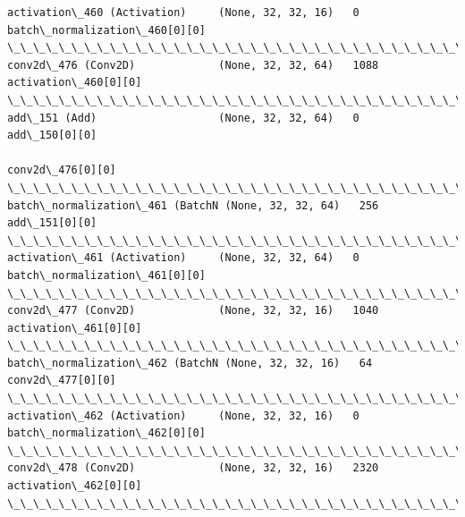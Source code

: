 \documentclass[11pt]{article}
\begin{document}
\begin{Verbatim}[commandchars=\\\{\}]
activation\_460 (Activation)     (None, 32, 32, 16)   0           batch\_normalization\_460[0][0]    
\_\_\_\_\_\_\_\_\_\_\_\_\_\_\_\_\_\_\_\_\_\_\_\_\_\_\_\_\_\_\_\_\_\_\_\_\_\_\_\_\_\_\_\_\_\_\_\_\_\_\_\_\_\_\_\_\_\_\_\_\_\_\_\_\_\_\_\_\_\_\_\_\_\_\_\_\_\_\_\_\_\_\_\_\_\_\_\_\_\_\_\_\_\_\_\_\_\_
conv2d\_476 (Conv2D)             (None, 32, 32, 64)   1088        activation\_460[0][0]             
\_\_\_\_\_\_\_\_\_\_\_\_\_\_\_\_\_\_\_\_\_\_\_\_\_\_\_\_\_\_\_\_\_\_\_\_\_\_\_\_\_\_\_\_\_\_\_\_\_\_\_\_\_\_\_\_\_\_\_\_\_\_\_\_\_\_\_\_\_\_\_\_\_\_\_\_\_\_\_\_\_\_\_\_\_\_\_\_\_\_\_\_\_\_\_\_\_\_
add\_151 (Add)                   (None, 32, 32, 64)   0           add\_150[0][0]                    
                                                                 conv2d\_476[0][0]                 
\_\_\_\_\_\_\_\_\_\_\_\_\_\_\_\_\_\_\_\_\_\_\_\_\_\_\_\_\_\_\_\_\_\_\_\_\_\_\_\_\_\_\_\_\_\_\_\_\_\_\_\_\_\_\_\_\_\_\_\_\_\_\_\_\_\_\_\_\_\_\_\_\_\_\_\_\_\_\_\_\_\_\_\_\_\_\_\_\_\_\_\_\_\_\_\_\_\_
batch\_normalization\_461 (BatchN (None, 32, 32, 64)   256         add\_151[0][0]                    
\_\_\_\_\_\_\_\_\_\_\_\_\_\_\_\_\_\_\_\_\_\_\_\_\_\_\_\_\_\_\_\_\_\_\_\_\_\_\_\_\_\_\_\_\_\_\_\_\_\_\_\_\_\_\_\_\_\_\_\_\_\_\_\_\_\_\_\_\_\_\_\_\_\_\_\_\_\_\_\_\_\_\_\_\_\_\_\_\_\_\_\_\_\_\_\_\_\_
activation\_461 (Activation)     (None, 32, 32, 64)   0           batch\_normalization\_461[0][0]    
\_\_\_\_\_\_\_\_\_\_\_\_\_\_\_\_\_\_\_\_\_\_\_\_\_\_\_\_\_\_\_\_\_\_\_\_\_\_\_\_\_\_\_\_\_\_\_\_\_\_\_\_\_\_\_\_\_\_\_\_\_\_\_\_\_\_\_\_\_\_\_\_\_\_\_\_\_\_\_\_\_\_\_\_\_\_\_\_\_\_\_\_\_\_\_\_\_\_
conv2d\_477 (Conv2D)             (None, 32, 32, 16)   1040        activation\_461[0][0]             
\_\_\_\_\_\_\_\_\_\_\_\_\_\_\_\_\_\_\_\_\_\_\_\_\_\_\_\_\_\_\_\_\_\_\_\_\_\_\_\_\_\_\_\_\_\_\_\_\_\_\_\_\_\_\_\_\_\_\_\_\_\_\_\_\_\_\_\_\_\_\_\_\_\_\_\_\_\_\_\_\_\_\_\_\_\_\_\_\_\_\_\_\_\_\_\_\_\_
batch\_normalization\_462 (BatchN (None, 32, 32, 16)   64          conv2d\_477[0][0]                 
\_\_\_\_\_\_\_\_\_\_\_\_\_\_\_\_\_\_\_\_\_\_\_\_\_\_\_\_\_\_\_\_\_\_\_\_\_\_\_\_\_\_\_\_\_\_\_\_\_\_\_\_\_\_\_\_\_\_\_\_\_\_\_\_\_\_\_\_\_\_\_\_\_\_\_\_\_\_\_\_\_\_\_\_\_\_\_\_\_\_\_\_\_\_\_\_\_\_
activation\_462 (Activation)     (None, 32, 32, 16)   0           batch\_normalization\_462[0][0]    
\_\_\_\_\_\_\_\_\_\_\_\_\_\_\_\_\_\_\_\_\_\_\_\_\_\_\_\_\_\_\_\_\_\_\_\_\_\_\_\_\_\_\_\_\_\_\_\_\_\_\_\_\_\_\_\_\_\_\_\_\_\_\_\_\_\_\_\_\_\_\_\_\_\_\_\_\_\_\_\_\_\_\_\_\_\_\_\_\_\_\_\_\_\_\_\_\_\_
conv2d\_478 (Conv2D)             (None, 32, 32, 16)   2320        activation\_462[0][0]             
\_\_\_\_\_\_\_\_\_\_\_\_\_\_\_\_\_\_\_\_\_\_\_\_\_\_\_\_\_\_\_\_\_\_\_\_\_\_\_\_\_\_\_\_\_\_\_\_\_\_\_\_\_\_\_\_\_\_\_\_\_\_\_\_\_\_\_\_\_\_\_\_\_\_\_\_\_\_\_\_\_\_\_\_\_\_\_\_\_\_\_\_\_\_\_\_\_\_

\end{Verbatim}
\end{document}
